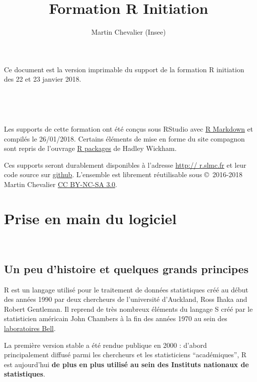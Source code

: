 \documentclass[12pt,twosided, notitlepage]{book}
\title{Formation R Initiation}
\author{Martin Chevalier (Insee)}
\date{}
\makeatletter
\newcommand*{\toccontents}{\@starttoc{toc}}
\newif \ifsol
\makeatother
\begin{document}
\maketitle

\thispagestyle{empty}

Ce document est la version imprimable du support de la formation R
initiation des 22 et 23 janvier 2018.

~

\toccontents

~

Les supports de cette formation ont été conçus sous RStudio avec
\href{http://rmarkdown.rstudio.com/}{R Markdown} et compilés le
26/01/2018. Certains éléments de mise en forme du site compagnon sont
repris de l'ouvrage \href{http://r-pkgs.had.co.nz/}{R packages} de
Hadley Wickham.

Ces supports seront durablement disponibles à l'adresse
\href{http://r.slmc.fr/}{http:// r.slmc.fr} et leur code source sur
\href{https://github.com/martinchevalier/r_insee}{github}. L'ensemble
est librement réutilisable sous ©~2016-2018 Martin Chevalier
\href{https://creativecommons.org/licenses/by-nc-sa/3.0/fr}{CC BY-NC-SA
3.0}.

\renewcommand{\cftsecfont}{\small\bfseries}

\soltrue

\chapter{Prise en main du logiciel}

\minitoc 

~

\section{Un peu d'histoire et quelques grands
principes}\label{un-peu-dhistoire-et-quelques-grands-principes}

R est un langage utilisé pour le traitement de données statistiques créé
au début des années 1990 par deux chercheurs de l'université d'Auckland,
Ross Ihaka and Robert Gentleman. Il reprend de très nombreux éléments du
langage S créé par le statisticien américain John Chambers à la fin des
années 1970 au sein des
\href{https://fr.wikipedia.org/wiki/Laboratoires_Bell}{laboratoires
Bell}.

La première version stable a été rendue publique en 2000 : d'abord
principalement diffusé parmi les chercheurs et les statisticiens
\enquote{académiques}, R est aujourd'hui \textbf{de plus en plus utilisé
au sein des Instituts nationaux de statistiques}.
\end{document}
